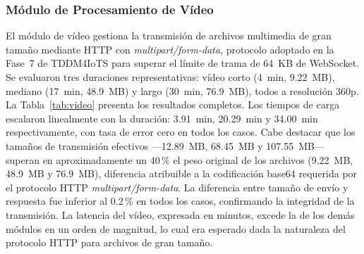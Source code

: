 \documentclass[journal]{IEEEtran}
\begin{document}
	\subsubsection{M\'odulo de Procesamiento de V\'ideo}
	El m\'odulo de v\'ideo gestiona la transmisi\'on de archivos multimedia de gran tama\~no mediante HTTP con \textit{multipart/form-data}, protocolo adoptado en la Fase~7 de TDDM4IoTS para superar el l\'imite de trama de 64~KB de WebSocket. Se evaluaron tres duraciones representativas: v\'ideo corto (4~min, 9.22~MB), mediano (17~min, 48.9~MB) y largo (30~min, 76.9~MB), todos a resoluci\'on 360p. La Tabla~\ref{tab:video} presenta los resultados completos. Los tiempos de carga escalaron linealmente con la duraci\'on: 3.91~min, 20.29~min y 34.00~min respectivamente, con tasa de error cero en todos los casos. Cabe destacar que los tama\~nos de transmisi\'on efectivos ---12.89~MB, 68.45~MB y 107.55~MB--- superan en aproximadamente un 40\,\% el peso original de los archivos (9.22~MB, 48.9~MB y 76.9~MB), diferencia atribuible a la codificaci\'on base64 requerida por el protocolo HTTP \textit{multipart/form-data}. La diferencia entre tama\~no de env\'io y respuesta fue inferior al 0.2\,\% en todos los casos, confirmando la integridad de la transmisi\'on. La latencia del v\'ideo, expresada en minutos, excede la de los dem\'as m\'odulos en un orden de magnitud, lo cual era esperado dada la naturaleza del protocolo HTTP para archivos de gran tama\~no.
	
\end{document}
